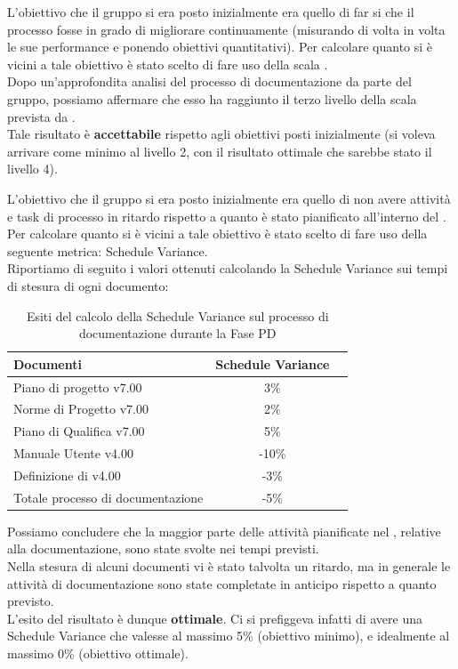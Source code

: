 				L'obiettivo che il gruppo si era posto inizialmente era quello di far si che il processo fosse in grado di migliorare continuamente (misurando di volta in volta le sue performance e ponendo obiettivi quantitativi). Per calcolare quanto si è vicini a tale obiettivo è stato scelto di fare uso della scala .\\
				Dopo un'approfondita analisi del processo di documentazione da parte del gruppo, possiamo affermare che esso ha raggiunto il terzo livello della scala prevista da .\\
				Tale risultato è \textbf{accettabile} rispetto agli obiettivi posti inizialmente (si voleva arrivare come minimo al livello 2, con il risultato ottimale che sarebbe stato il livello 4).
			
				L'obiettivo che il gruppo si era posto inizialmente era quello di non avere attività e task di processo in ritardo rispetto a quanto è stato pianificato all'interno del . Per calcolare quanto si è vicini a tale obiettivo è stato scelto di fare uso della seguente metrica: Schedule Variance.\\
				Riportiamo di seguito i valori ottenuti calcolando la Schedule Variance sui tempi di stesura di ogni documento:			
				\begin{table}[H]
					\centering
					\begin{tabu}{| l | c | c |}
						\hline
						Documenti 							& Schedule Variance   \\ \hline \hline
						Piano di progetto v7.00				& 3\%                 \\ \hline
						Norme di Progetto v7.00 			& 2\%                 \\ \hline
						Piano di Qualifica v7.00 			& 5\%                 \\ \hline
						Manuale Utente v4.00 				& -10\%               \\ \hline
						Definizione di  v4.00 		& -3\%                \\ \hline
						Totale processo di documentazione 	& -5\%                \\ \hline
					\end{tabu}
					\caption{Esiti del calcolo della Schedule Variance sul processo di documentazione durante la Fase PD}
				\end{table}
				Possiamo concludere che la maggior parte delle attività pianificate nel , relative alla documentazione, sono state svolte nei tempi previsti.\\ Nella stesura di alcuni documenti vi è stato talvolta un ritardo, ma in generale le attività di documentazione sono state completate in anticipo rispetto a quanto previsto.\\
				L'esito del risultato è dunque \textbf{ottimale}. Ci si prefiggeva infatti di avere una Schedule Variance che valesse al massimo 5\% (obiettivo minimo), e idealmente al massimo 0\% (obiettivo ottimale).

